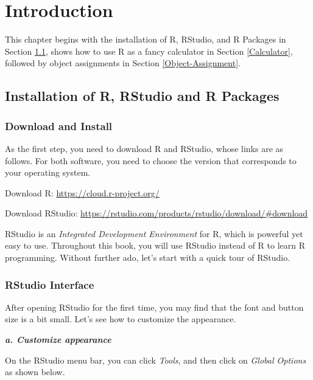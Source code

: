 \documentclass[
]{book}
\begin{document}
\hypertarget{introduction}{%
\chapter{Introduction}\label{introduction}}

This chapter begins with the installation of R, RStudio, and R Packages in Section \ref{Installation}, shows how to use R as a fancy calculator in Section \ref{Calculator}, followed by object assignments in Section \ref{Object-Assignment}.

\hypertarget{Installation}{%
\section{Installation of R, RStudio and R Packages}\label{Installation}}

\hypertarget{download-and-install}{%
\subsection{Download and Install}\label{download-and-install}}

As the first step, you need to download R and RStudio, whose links are as follows. For both software, you need to choose the version that corresponds to your operating system.

Download R: \url{https://cloud.r-project.org/}

Download RStudio: \url{https://rstudio.com/products/rstudio/download/\#download}

RStudio is an \emph{Integrated Development Environment} for R, which is powerful yet easy to use. Throughout this book, you will use RStudio instead of R to learn R programming. Without further ado, let's start with a quick tour of RStudio.

\hypertarget{rstudio-interface}{%
\subsection{RStudio Interface}\label{rstudio-interface}}

After opening RStudio for the first time, you may find that the font and button size is a bit small. Let's see how to customize the appearance.

\textbf{\emph{a. Customize appearance}}

On the RStudio menu bar, you can click \emph{Tools}, and then click on \emph{Global Options} as shown below.
\end{document}
